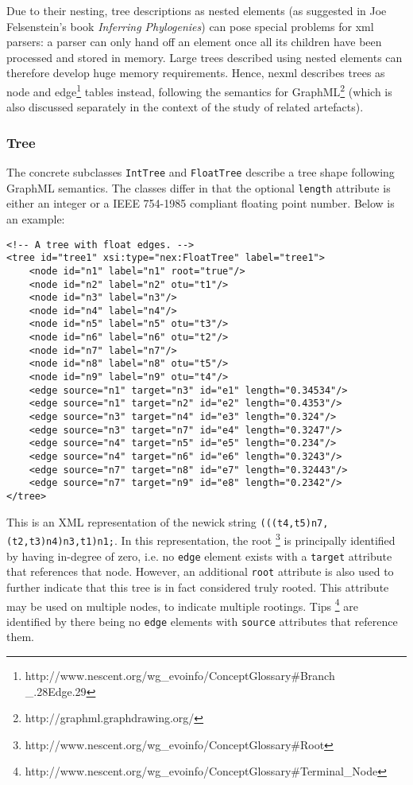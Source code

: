 \documentclass{article}
\newcommand{\code}{\texttt} \usepackage{fullpage}
\begin{document}
Due to their nesting, tree descriptions as nested elements (as suggested
in Joe Felsenstein's book \textit{Inferring Phylogenies}) can pose
special problems for xml parsers: a parser can only hand off an element
once all its children have been processed and stored in memory. Large
trees described using nested elements can therefore develop huge memory
requirements. Hence, nexml describes trees as node and
edge\footnote{http://www.nescent.org/wg\_evoinfo/ConceptGlossary\#Branch
\_.28Edge.29} tables instead, following the semantics for
GraphML\footnote{http://graphml.graphdrawing.org/} (which is also
discussed separately in the context of the study of related artefacts).
\subsubsection{Tree} 

The concrete subclasses \code{IntTree} and \code{FloatTree} describe a
tree shape following GraphML semantics. The classes differ in that the
optional \code{length} attribute is either an integer or a IEEE 754-1985
compliant floating point number. Below is an example: 
\begin{verbatim}
<!-- A tree with float edges. --> 
<tree id="tree1" xsi:type="nex:FloatTree" label="tree1"> 
    <node id="n1" label="n1" root="true"/> 
    <node id="n2" label="n2" otu="t1"/> 
    <node id="n3" label="n3"/> 
    <node id="n4" label="n4"/> 
    <node id="n5" label="n5" otu="t3"/> 
    <node id="n6" label="n6" otu="t2"/> 
    <node id="n7" label="n7"/> 
    <node id="n8" label="n8" otu="t5"/> 
    <node id="n9" label="n9" otu="t4"/> 
    <edge source="n1" target="n3" id="e1" length="0.34534"/> 
    <edge source="n1" target="n2" id="e2" length="0.4353"/> 
    <edge source="n3" target="n4" id="e3" length="0.324"/>
    <edge source="n3" target="n7" id="e4" length="0.3247"/> 
    <edge source="n4" target="n5" id="e5" length="0.234"/> 
    <edge source="n4" target="n6" id="e6" length="0.3243"/> 
    <edge source="n7" target="n8" id="e7" length="0.32443"/> 
    <edge source="n7" target="n9" id="e8" length="0.2342"/> 
</tree> 
\end{verbatim} 
This is an XML representation
of the newick string \code{(((t4,t5)n7,(t2,t3)n4)n3,t1)n1;}. In this
representation, the root
\footnote{http://www.nescent.org/wg\_evoinfo/ConceptGlossary\#Root} is
principally identified by having in-degree of zero, i.e. no \code{edge}
element exists with a \code{target} attribute that references that node.
However, an additional \code{root} attribute is also used to further
indicate that this tree is in fact considered truly rooted. This
attribute may be used on multiple nodes, to indicate multiple rootings.
Tips
\footnote{http://www.nescent.org/wg\_evoinfo/ConceptGlossary\#Terminal\_Node} 
are identified by there being no \code{edge} elements with
\code{source} attributes that reference them.
\end{document}
